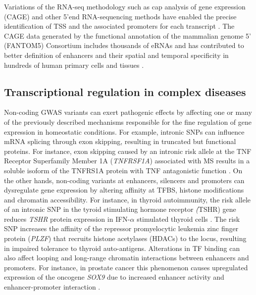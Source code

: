 Variations of the RNA-seq methodology such as cap analysis of gene expression (CAGE) and other 5'\-end RNA-sequencing methods have enabled the precise identification of TSS and the associated promoters for each transcript  \parencite{Yamashita2011,FANTOM2014}. The CAGE data generated by the functional annotation of the mammalian genome 5' (FANTOM5) Consortium includes thousands of eRNAs and has contributed to better definition of enhancers and their spatial and temporal specificity in hundreds of human primary cells and tissues \parencite{Andersson2014}. %


\subsection{Transcriptional regulation in complex diseases}

Non-coding GWAS variants can exert pathogenic effects by affecting one or many of the previously described mechanisms responsible for the fine regulation of gene expression in homeostatic conditions. For example, intronic SNPs can influence mRNA splicing through exon skipping, resulting in truncated but functional proteins. For instance, exon skipping caused by an intronic risk allele at the TNF Receptor Superfamily Member 1A (\textit{TNFRSF1A}) associated with MS results in a soluble isoform of the TNFRS1A protein with TNF antagonistic function \parencite{Gregory2012}. On the other hands, non-coding variants at enhancers, silencers and promoters can dysregulate gene expression by altering affinity at TFBS, histone modifications and chromatin accessibility. For instance, in thyroid autoimmunity, the risk allele of an intronic SNP in the tyroid stimulating hormone receptor \textit(TSHR) gene reduces \textit{TSHR} protein expression in IFN-$\alpha$ stimulated thyroid cells \parencite{Stefan2014}. The risk SNP increases the affinity of the repressor promyelocytic leukemia zinc finger protein (\textit{PLZF}) that recruits histone acetylases (HDACs) to the locus, resulting in impaired tolerance to thyroid auto-antigens. Alterations in TF binding can also affect looping and long-range chromatin interactions between enhancers and promoters. For instance, in prostate cancer this phenomenon causes upregulated expression of the oncogene \textit{SOX9} due to increased enhancer activity and enhancer-promoter interaction \parencite{Zhang2012}. 

